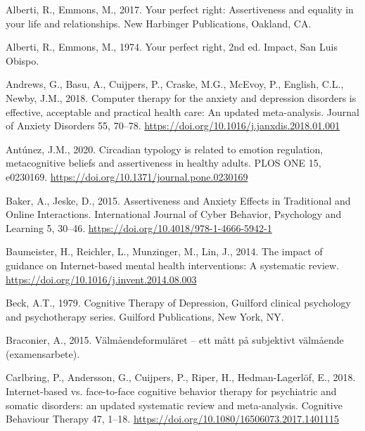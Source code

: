 \documentclass[preprint,
3p]{elsarticle} %
\newlength{\cslhangindent}
\newlength{\cslentryspacingunit} %
\newenvironment{CSLReferences}[2] %
 {%
  \setlength{\parindent}{0pt}
  \ifodd #1
  \let\oldpar\par
  \def\par{\hangindent=\cslhangindent\oldpar}
  \fi
  \setlength{\parskip}{#2\cslentryspacingunit}
 }%
 {}
\begin{document}
\hypertarget{refs}{}
\begin{CSLReferences}{1}{0}
\leavevmode{}%
Alberti, R., Emmons, M., 2017. {Your perfect right: Assertiveness and
equality in your life and relationships}. New Harbinger Publications,
Oakland, CA.

\leavevmode{}%
Alberti, R., Emmons, M., 1974. {Your perfect right}, 2nd ed. Impact, San
Luis Obispo.

\leavevmode{}%
Andrews, G., Basu, A., Cuijpers, P., Craske, M.G., McEvoy, P., English,
C.L., Newby, J.M., 2018. {Computer therapy for the anxiety and
depression disorders is effective, acceptable and practical health care:
An updated meta-analysis}. Journal of Anxiety Disorders 55, 70--78.
\url{https://doi.org/10.1016/j.janxdis.2018.01.001}

\leavevmode{}%
Antúnez, J.M., 2020. Circadian typology is related to emotion
regulation, metacognitive beliefs and assertiveness in healthy adults.
PLOS ONE 15, e0230169.
\url{https://doi.org/10.1371/journal.pone.0230169}

\leavevmode{}%
Baker, A., Jeske, D., 2015. {Assertiveness and Anxiety Effects in
Traditional and Online Interactions}. International Journal of Cyber
Behavior, Psychology and Learning 5, 30--46.
\url{https://doi.org/10.4018/978-1-4666-5942-1}

\leavevmode{}%
Baumeister, H., Reichler, L., Munzinger, M., Lin, J., 2014. {The impact
of guidance on Internet-based mental health interventions: A systematic
review}. \url{https://doi.org/10.1016/j.invent.2014.08.003}

\leavevmode{}%
Beck, A.T., 1979. {Cognitive Therapy of Depression}, Guilford clinical
psychology and psychotherapy series. Guilford Publications, New York,
NY.

\leavevmode{}%
Braconier, A., 2015. {V{ä}lm{å}endeformul{ä}ret -- ett m{å}tt p{å}
subjektivt v{ä}lm{å}ende (examensarbete)}.

\leavevmode{}%
Carlbring, P., Andersson, G., Cuijpers, P., Riper, H., Hedman-Lagerlöf,
E., 2018. {Internet-based vs. face-to-face cognitive behavior therapy
for psychiatric and somatic disorders: an updated systematic review and
meta-analysis}. Cognitive Behaviour Therapy 47, 1--18.
\url{https://doi.org/10.1080/16506073.2017.1401115}


\end{CSLReferences}
\end{document}
